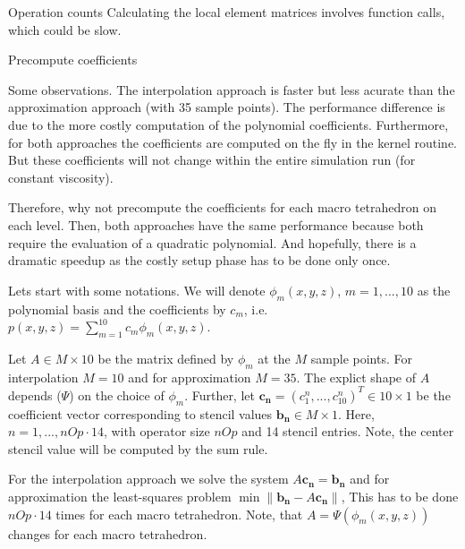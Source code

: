 \documentclass[a4paper,11pt,reqno]{amsart}
\numberwithin{figure}{section}
\numberwithin{table}{section}
\begin{document}
\begin{section}{Operation counts}
Calculating the local element matrices involves function calls, which could be slow.\\

\end{section}








\clearpage

\begin{section}{Precompute coefficients}
\label{sec:PrecomputeCoefficients}


Some observations.
The interpolation approach is faster but less acurate 
than the approximation approach (with 35 sample points).
The performance difference is due to the more costly
computation of the polynomial coefficients.
Furthermore, for both approaches the coefficients
are computed on the fly in the kernel routine. 
But these coefficients will not change within the entire
simulation run (for constant viscosity).

Therefore, why not precompute the coefficients for each 
macro tetrahedron on each level.
Then, both approaches have the same performance because
both require the evaluation of a quadratic polynomial. And hopefully,
there is a dramatic speedup as the costly setup phase has to be done
only once.

Lets start with some notations. We will denote $\phi_m(x,y,z)$, $m = 1,...,10$
as the polynomial basis and the coefficients by $c_m$, i.e.
$p(x,y,z) = \sum_{m=1}^{10}c_m\phi_m(x,y,z)$. 

Let $A \in M\times 10$ be the matrix defined by $\phi_m$ at the
$M$ sample points. For interpolation $M=10$ and for approximation
$M=35$. The explict shape of $A$ depends ($\Psi$) on the choice of 
$\phi_m$. Further, let $\mathbf{c_n} = (c^n_1,...,c^n_{10})^T \in 10\times 1$ 
be the coefficient
vector corresponding to stencil values $\mathbf{b_n} \in M \times 1$. Here,
$n = 1,...,nOp\cdot14$, with operator size $nOp$ and 14 stencil entries.
Note, the center stencil value will be computed by the sum rule.


For the interpolation approach we solve  
the system
$A\mathbf{c_n}= \mathbf{b_n}$ and for approximation the
least-squares problem 
$\min\|\mathbf{b_n} - A\mathbf{c_n}\|$, 
This has to be done $nOp\cdot14$ times for each macro tetrahedron. 
Note, that $A = \Psi(\phi_m(x,y,z))$ changes for each macro tetrahedron.



\end{section}
\end{document}
